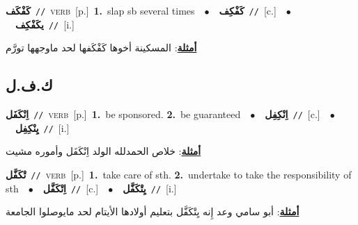 \documentclass[10pt,a4paper,twoside]{article} %
\begin{document}
\begin{multicols}{2}
{\setlength\topsep{0pt}\textbf{\foreignlanguage{arabic}{كَفْكَف}}\ {\color{gray}\texttt{//}\color{black}}\ \textsc{verb}\ [p.]\ \textbf{1.}~slap sb several times\ \ $\bullet$\ \ \setlength\topsep{0pt}\textbf{\foreignlanguage{arabic}{كَفْكِف}}\ {\color{gray}\texttt{//}\color{black}}\ [c.]\ \ $\bullet$\ \ \setlength\topsep{0pt}\textbf{\foreignlanguage{arabic}{يكَفْكِف}}\ {\color{gray}\texttt{//}\color{black}}\ [i.]\  \begin{flushright}\color{gray}\foreignlanguage{arabic}{\textbf{\underline{\foreignlanguage{arabic}{أمثلة}}}: المسكينة أخوها كَفْكَفها لحد ماوجهها تورَّم}\end{flushright}\color{black}} \vspace{2mm}

\vspace{-3mm}
\subsection*{\color{blue}\foreignlanguage{arabic}{ك.ف.ل}\color{blue}{}} 

{\setlength\topsep{0pt}\textbf{\foreignlanguage{arabic}{اِنْكَفَل}}\ {\color{gray}\texttt{//}\color{black}}\ \textsc{verb}\ [p.]\ \textbf{1.}~be sponsored.  \textbf{2.}~be guaranteed\ \ $\bullet$\ \ \setlength\topsep{0pt}\textbf{\foreignlanguage{arabic}{اِنْكِفِل}}\ {\color{gray}\texttt{//}\color{black}}\ [c.]\ \ $\bullet$\ \ \setlength\topsep{0pt}\textbf{\foreignlanguage{arabic}{يِنْكِفِل}}\ {\color{gray}\texttt{//}\color{black}}\ [i.]\  \begin{flushright}\color{gray}\foreignlanguage{arabic}{\textbf{\underline{\foreignlanguage{arabic}{أمثلة}}}: خلاص الحمدلله الولد اِنْكَفَل وأموره مشيت}\end{flushright}\color{black}} \vspace{2mm}

{\setlength\topsep{0pt}\textbf{\foreignlanguage{arabic}{تْكَفَّل}}\ {\color{gray}\texttt{//}\color{black}}\ \textsc{verb}\ [p.]\ \textbf{1.}~take care of sth.  \textbf{2.}~undertake to take the responsibility of sth\ \ $\bullet$\ \ \setlength\topsep{0pt}\textbf{\foreignlanguage{arabic}{اِتْكَفَّل}}\ {\color{gray}\texttt{//}\color{black}}\ [c.]\ \ $\bullet$\ \ \setlength\topsep{0pt}\textbf{\foreignlanguage{arabic}{يِتْكَفَّل}}\ {\color{gray}\texttt{//}\color{black}}\ [i.]\  \begin{flushright}\color{gray}\foreignlanguage{arabic}{\textbf{\underline{\foreignlanguage{arabic}{أمثلة}}}: أبو سامي وعد إِنه يِتْكَفَّل بتعليم أولادها الأيتام لحد مايوصلوا الجامعة}\end{flushright}\color{black}} \vspace{2mm}


\end{multicols}
\end{document}
